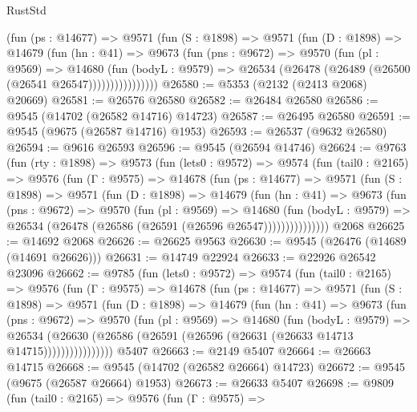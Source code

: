 \begin{lexlean}{RustStd}
\begin{coremodule}
              (fun (ps : @14677) =>
              @9571
                (fun (S : @1898) =>
                @9571
                  (fun (D : @1898) =>
                  @14679
                    (fun (hn : @41) =>
                    @9673
                      (fun (pns : @9672) =>
                      @9570
                        (fun (pl : @9569) =>
                        @14680
                          (fun (bodyL : @9579) =>
                          @26534 (@26478 (@26489 (@26500 (@26541 @26547))))))))))))))))
@26580 := @5353 (@2132 (@2413 @2068) @20669)
@26581 := @26576 @26580
@26582 := @26484 @26580
@26586 := @9545 (@14702 (@26582 @14716) @14723)
@26587 := @26495 @26580
@26591 := @9545 (@9675 (@26587 @14716) @1953)
@26593 := @26537 (@9632 @26580)
@26594 := @9616 @26593
@26596 := @9545 (@26594 @14746)
@26624 := @9763
    (fun (rty : @1898) =>
    @9573
      (fun (lets0 : @9572) =>
      @9574
        (fun (tail0 : @2165) =>
        @9576
          (fun (Γ : @9575) =>
          @14678
            (fun (ps : @14677) =>
            @9571
              (fun (S : @1898) =>
              @9571
                (fun (D : @1898) =>
                @14679
                  (fun (hn : @41) =>
                  @9673
                    (fun (pns : @9672) =>
                    @9570
                      (fun (pl : @9569) =>
                      @14680
                        (fun (bodyL : @9579) =>
                        @26534 (@26478 (@26586 (@26591 (@26596 @26547)))))))))))))))
    @2068
@26625 := @14692 @2068
@26626 := @26625 @9563
@26630 := @9545 (@26476 (@14689 (@14691 @26626)))
@26631 := @14749 @22924
@26633 := @22926 @26542 @23096
@26662 := @9785
    (fun (lets0 : @9572) =>
    @9574
      (fun (tail0 : @2165) =>
      @9576
        (fun (Γ : @9575) =>
        @14678
          (fun (ps : @14677) =>
          @9571
            (fun (S : @1898) =>
            @9571
              (fun (D : @1898) =>
              @14679
                (fun (hn : @41) =>
                @9673
                  (fun (pns : @9672) =>
                  @9570
                    (fun (pl : @9569) =>
                    @14680
                      (fun (bodyL : @9579) =>
                      @26534
                        (@26630
                          (@26586 (@26591 (@26596 (@26631 (@26633 @14713 @14715))))))))))))))))
    @5407
@26663 := @2149 @5407
@26664 := @26663 @14715
@26668 := @9545 (@14702 (@26582 @26664) @14723)
@26672 := @9545 (@9675 (@26587 @26664) @1953)
@26673 := @26633 @5407
@26698 := @9809
    (fun (tail0 : @2165) =>
    @9576
      (fun (Γ : @9575) =>

\end{coremodule}
\end{lexlean}
